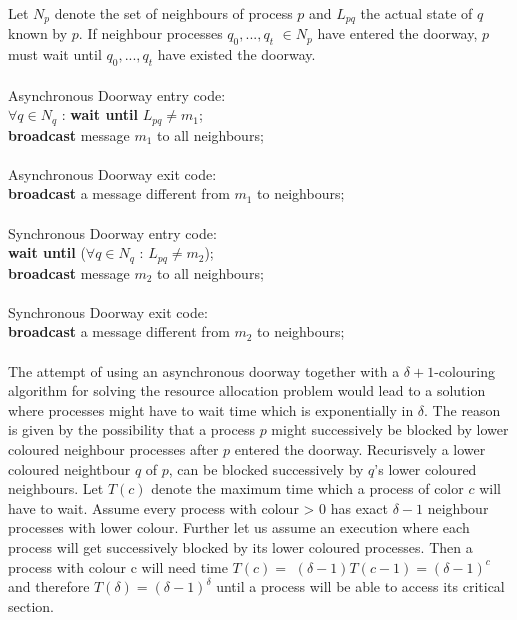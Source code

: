 \documentclass[a4paper]{article}
\newcommand{\question}[2][]{
  \parbox[t]{\textwidth}{
    \ifthenelse{\equal{#1}{}}{}{#1)}
    \parbox[t]{0.95\textwidth}{#2}}\\}
\newcommand{\solution}[2][]{
  \ifthenelse{\equal{#1}{} \or \equal{#1}{a}}{\\[3pt]\textit{Solution: }\\[0.1cm]}{}
  \question[#1]{#2}
}
\begin{document}
\solution{
  Let $N_p$ denote the set of neighbours of process $p$ and $L_{pq}$ the
  actual state of $q$ known by $p$. If neighbour processes $q_0,...,q_t$
  $\in N_p$ have entered the doorway, $p$ must wait until $q_0,...,q_t$ 
  have existed the doorway. \\ \\
  Asynchronous Doorway entry code:\\
  $\forall q \in N_q$ : \textbf{wait until} $L_{pq} \neq m_1$;\\
  \textbf{broadcast} message $m_1$ to all neighbours;\\ \\
  Asynchronous Doorway exit code: \\
  \textbf{broadcast} a message different from $m_1$ to neighbours;\\ \\
  Synchronous Doorway entry code:\\
  \textbf{wait until} ($\forall q \in N_q$ : $L_{pq} \neq m_2$);\\
  \textbf{broadcast} message $m_2$ to all neighbours;\\ \\
  Synchronous Doorway exit code:\\
  \textbf{broadcast} a message different from $m_2$ to neighbours;\\ \\
  The attempt of using an asynchronous doorway together with a $\delta +1$-colouring
  algorithm for solving the resource allocation problem would lead to a solution where
  processes might have to wait time which is exponentially in $\delta$. The reason 
  is given by the possibility that a process $p$ might successively be blocked by 
  lower coloured neighbour processes after $p$ entered the doorway. Recurisvely a lower
  coloured neightbour $q$ of $p$, can be blocked successively by $q$'s lower coloured
  neighbours. Let $T(c)$ denote the maximum time which a process of color $c$ will have
  to wait. Assume every process with colour > 0 has exact $\delta - 1$ neighbour processes
  with lower colour. Further let us assume an execution where each process will get successively
  blocked by its lower coloured processes. Then a process with colour c will need time $T(c) =$
  $(\delta-1)T(c-1)=(\delta-1)^c$ and therefore $T(\delta)=(\delta-1)^\delta$ until a process
  will be able to access its critical section.
}
%
\end{document}
